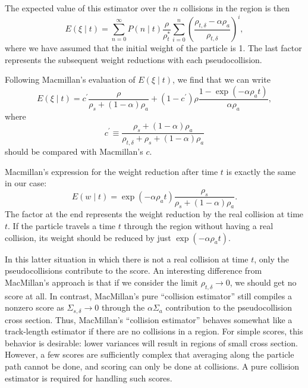 \documentclass[12pt]{report}
\begin{document}
The expected value of this estimator over the $n$ collisions in the
region is then
\begin{equation}
E(\xi \mid t) = \sum_{n=0}^{\infty} P(n \mid t) \frac{\rho}{\rho_{t}^{\ast}}
\sum_{i=0}^{n} \left( 
\frac{\rho_{t,\delta} - \alpha \rho_{a}}{\rho_{t,\delta}} \right)^{i},
\end{equation}
where we have assumed that the initial weight of the particle is 1. The
last factor represents the subsequent weight reductions with each
pseudocollision.

Following Macmillan's evaluation of $E(\xi \mid t)$, we find that we
can write
\begin{equation}
E(\xi \mid t) = c^{\prime} \frac{\rho}{\rho_{s} + (1 - \alpha) \rho_{a}}
+ (1 - c^{\prime}) \rho \frac{1 - \exp(- \alpha \rho_{a} t)}{\alpha \rho_{a}},
\end{equation}
where
\begin{equation}
c^{\prime} \equiv 
\frac{\rho_{s} + (1 - \alpha) \rho_{a}}{\rho_{t,\delta} + \rho_{s} 
+ (1 - \alpha) \rho_{a}}
\end{equation}
should be compared with Macmillan's $c$.

Macmillan's expression for the weight reduction after time $t$
is exactly the same in our case:
\begin{equation}
E(w \mid t) = \exp( - \alpha \rho_{a} t) \frac{\rho_{s}}{\rho_{s} + (1 - \alpha) \rho_{a}}.
\end{equation}
The factor at the end represents the weight reduction by the real collision
at time $t$. If the particle travels a time $t$ through the region without
having a real collision, its weight should be reduced by just
$\exp( - \alpha \rho_{a} t)$.

In this latter situation in which there is not a real collision at time
$t$, only the pseudocollisions contribute to the score. An interesting
difference from MacMillan's approach is that if we consider the limit
$\rho_{t,\delta} \rightarrow 0$, we should get no score at all. In
contrast, MacMillan's pure ``collision estimator'' still compiles
a nonzero score as $\Sigma_{s,\delta} \rightarrow 0$ through the
$\alpha \Sigma_{a}$ contribution to the pseudocollision cross section.
Thus, MacMillan's ``collision estimator'' behaves somewhat like
a track-length estimator if there are no collisions in a region.
For simple scores, this behavior is desirable: lower variances will
result in regions of small cross section. However, a few scores are
sufficiently complex that averaging along the particle path cannot
be done, and scoring can only be done at collisions. A pure 
collision estimator is required for handling such scores.
\end{document}
